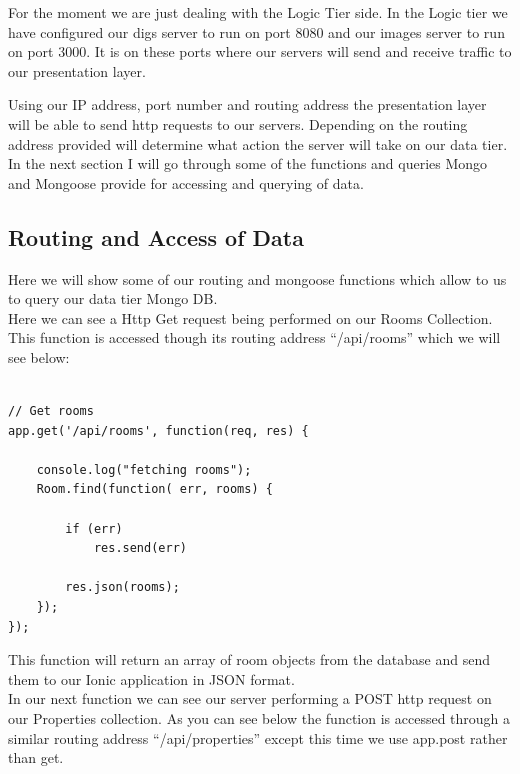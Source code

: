 For the moment we are just dealing with the Logic Tier side. In the Logic tier we have configured our digs server to run on port 8080 and our images server to run on port 3000. It is on these ports where our servers will send and receive traffic to our presentation layer.

Using our IP address, port number and routing address the presentation layer will be able to send http requests to our servers. Depending on the routing address provided will determine what action the server will take on our data tier. In the next section I will go through some of the functions and queries Mongo and Mongoose provide for accessing and querying of data.

\subsection{Routing and Access of Data}

Here we will show some of our routing and mongoose functions which allow to us to query our data tier Mongo DB. \\

Here we can see a Http Get request being performed on our Rooms Collection. This function is accessed though its routing address “/api/rooms” which we will see below:\\

\begin{verbatim}

// Get rooms
app.get('/api/rooms', function(req, res) {

	console.log("fetching rooms");
	Room.find(function( err, rooms) {

		if (err)
			res.send(err)

		res.json(rooms); 
	});
});

\end{verbatim}


This function will return an array of room objects from the database and send them to our Ionic application in JSON format.\\


In our next function we can see our server performing a POST http request on our Properties collection. As you can see below the function is accessed through a similar routing address “/api/properties” except this time we use app.post rather than get. \\

